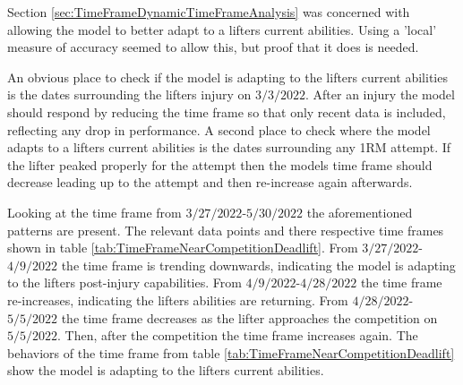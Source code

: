 Section \ref{sec:TimeFrameDynamicTimeFrameAnalysis} was concerned with allowing the model to better adapt to a lifters current abilities. Using a 'local' measure of accuracy seemed to allow this, but proof that it does is needed.

An obvious place to check if the model is adapting to the lifters current abilities is the dates surrounding the lifters injury on $3/3/2022$. After an injury the model should respond by reducing the time frame so that only recent data is included, reflecting any drop in performance. A second place to check where the model adapts to a lifters current abilities is the dates surrounding any 1RM attempt. If the lifter peaked properly for the attempt then the models time frame should decrease leading up to the attempt and then re-increase again afterwards.

Looking at the time frame from $3/27/2022$-$5/30/2022$ the aforementioned patterns are present. The relevant data points and there respective time frames shown in table \ref{tab:TimeFrameNearCompetitionDeadlift}. From $3/27/2022$-$4/9/2022$ the time frame is trending downwards, indicating the model is adapting to the lifters post-injury capabilities. From $4/9/2022$-$4/28/2022$ the time frame re-increases, indicating the lifters abilities are returning. From $4/28/2022$-$5/5/2022$ the time frame decreases as the lifter approaches the competition on $5/5/2022$. Then, after the competition the time frame increases again. The behaviors of the time frame from table \ref{tab:TimeFrameNearCompetitionDeadlift} show the model is adapting to the lifters current abilities.


